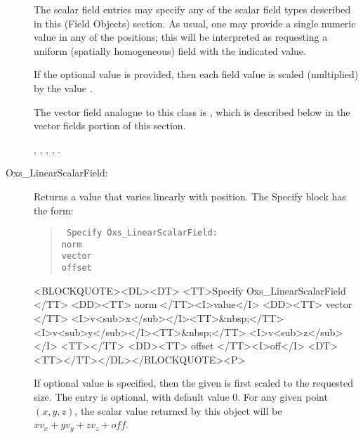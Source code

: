 \begin{description}
   The scalar field entries may specify any of the scalar field types
   described in this (Field Objects) section.  As usual, one may provide
   a single numeric value in any of the 
   positions; this will be interpreted as requesting a uniform (spatially
   homogeneous) field with the indicated value.

   If the optional  value is provided, then each
   field value is scaled (multiplied) by the value .

   The vector field analogue to this class is
   ,
   which is described below in the vector fields portion of this
   section.

   \begin{ExampleMifs}
     , ,
     , , .
   \end{ExampleMifs}

\item[Oxs\_LinearScalarField:]
%
   Returns a value that varies linearly with position.  The Specify
   block has the form:
      \begin{latexonly}
      \begin{quote}\tt
      Specify Oxs\_LinearScalarField: \ocb\\
       \bi norm \\
       \bi vector \ocb{}\ccb\\
       \bi offset \\
      \ccb
      \end{quote}
      \end{latexonly}
      \begin{rawhtml}
      <BLOCKQUOTE><DL><DT>
      <TT>Specify Oxs_LinearScalarField {</TT>
      <DD><TT> norm </TT><I>value</I>
      <DD><TT> vector {</TT>
         <I>v<sub>x</sub></I><TT>&nbsp;</TT>
         <I>v<sub>y</sub></I><TT>&nbsp;</TT>
         <I>v<sub>z</sub></I> <TT>}</TT>
      <DD><TT> offset </TT><I>off</I>
      <DT><TT>}</TT></DL></BLOCKQUOTE><P>
      \end{rawhtml}
   If optional value  is specified, then the given
    is first scaled to the requested size.  The
    entry is optional, with default value 0. For any
   given point $(x,y,z)$, the scalar value returned by this
   object will be $xv_x+yv_y+zv_z + off$.


\end{description}
